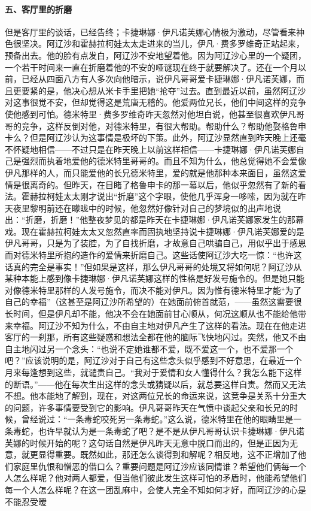 \paragraph*{五、客厅里的折磨}
\par 但是客厅里的谈话，已经告终；卡捷琳娜·伊凡诺芙娜心情极为激动，尽管看来神色很坚决。阿辽沙和霍赫拉柯娃太太走进来的当儿，伊凡·费多罗维奇正站起来，预备出去。他的脸有点发白，阿辽沙不安地望着他。因为阿辽沙心里的一个疑团，一个若干时间来一直在折磨着他的不安的哑谜现在终于就要解决了。还在一个月以前，已经从四面八方有人多次向他暗示，说伊凡哥哥爱卡捷琳娜·伊凡诺芙娜，而且更要紧的是，他决心想从米卡手里把她“抢夺”过去。直到最近以前，虽然阿辽沙对这事很觉不安，但却觉得这是荒唐无稽的。他爱两位兄长，他们中间这样的竞争使他感到可怕。德米特里·费多罗维奇昨天忽然对他坦白说，他甚至很喜欢伊凡哥哥的竞争，这样反倒对他，对德米特里，有很大帮助。帮助什么？帮助他娶格鲁申卡么？但是阿辽沙认为这事情是极坏的下策。此外，阿辽沙显然直到昨天晚上还毫不怀疑地相信——不过只是在昨天晚上以前这样相信——卡捷琳娜·伊凡诺芙娜自己是强烈而执着地爱他的德米特里哥哥的。而且不知为什么，他总觉得她不会爱像伊凡那样的人，而只能爱他的长兄德米特里，爱的就是他那种本来面目，虽然这爱情是很离奇的。但昨天，在目睹了格鲁申卡的那一幕以后，他似乎忽然有了新的看法。霍赫拉柯娃太太刚才说出“折磨”这个字眼，使他几乎浑身一哆嗦，因为就在昨天夜里黎明前还在矇眬中的时候，他忽然好像针对自己的梦境似的出声地说出：“折磨，折磨！”他整夜梦见的都是昨天在卡捷琳娜·伊凡诺芙娜家发生的那幕戏。现在霍赫拉柯娃太太又忽然直率而固执地坚持说卡捷琳娜·伊凡诺芙娜爱的是伊凡哥哥，只是为了装腔，为了自找折磨，才故意自己哄骗自己，用似乎出于感恩而对德米特里所抱的造作的爱情来折磨自己。这些话使阿辽沙大吃一惊：“也许这话真的完全是事实！”但如果是这样，那么伊凡哥哥的处境又将如何呢？阿辽沙从某种本能上感到像卡捷琳娜·伊凡诺芙娜这样的性格是好发号施令的。但是她只能对像德米特里那样的人发号施令，而决不能对伊凡。因为惟有德米特里才能“为了自己的幸福”（这甚至是阿辽沙所希望的）在她面前俯首就范，——虽然这需要很长时间，但是伊凡却不能，他决不会在她面前甘心顺从，何况这顺从也不能给他带来幸福。阿辽沙不知为什么，不由自主地对伊凡产生了这样的看法。现在在他走进客厅的一刹那，所有这些疑惑和想法全都在他的脑际飞快地闪过。突然，他又不由自主地闪过另一个念头：“也说不定她谁都不爱，既不爱这一个，也不爱那一个吧？”应该说明的是，阿辽沙对于自己有这些念头似乎感到不好意思，在最近一个月来每逢想到这些，就谴责自己。“我对于爱情和女人懂得什么？我怎么能下这样的断语。”——他在每次生出这样的念头或猜疑以后，就总要这样自责。然而又无法不想。他本能地了解到，现在，对这两位兄长的命运来说，这竞争是关系十分重大的问题，许多事情要受到它的影响。伊凡哥哥昨天在气愤中谈起父亲和长兄的时候，曾经说过：“一条毒蛇咬死另一条毒蛇。”这么说，德米特里在他的眼睛里是一条毒蛇，也许早就认为是一条毒蛇了吧？是不是从伊凡哥哥认识卡捷琳娜·伊凡诺芙娜的时候开始的呢？这句话自然是伊凡昨天无意中脱口而出的，但是正因为无意，就更显得重要。既然如此，那还怎么谈得到和解呢？相反地，这不正增加了他们家庭里仇恨和憎恶的借口么？重要问题是阿辽沙应该同情谁？希望他们俩每一个人怎么样呢？他对两人都爱，但当他们彼此发生这样可怕的矛盾时，他能希望他们每一个人怎么样呢？在这一团乱麻中，会使人完全不知如何才好，而阿辽沙的心是不能忍受暧